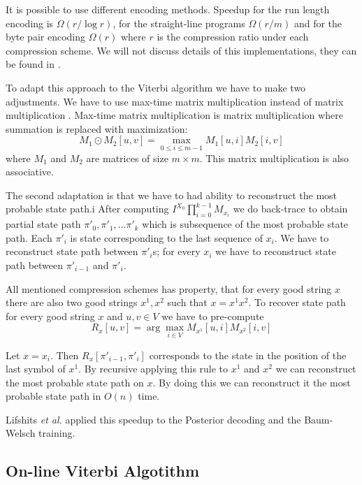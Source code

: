 It is possible to use different encoding methods. Speedup for the run length encoding 
is $\Omega(r/\log r)$, for the straight-line programs $\Omega(r/m)$ and for the
byte pair encoding $\Omega(r)$ where $r$ is the compression ratio under each
compression scheme. We will not discuss details of this implementations, they
can be found in \cite{Lifshits2009}.

To adapt this approach to the Viterbi algorithm we have to make two adjustments. 
We have to use max-time matrix multiplication instead of matrix multiplication
\cite{Lifshits2009}. Max-time matrix multiplication is matrix multiplication
where summation is replaced with maximization:
\[M_1\odot M_2 [u,v] = \max_{0\leq i\leq m-1}M_1[u,i]M_2[i,v] \]
where $M_1$ and $M_2$ are matrices of size $m\times m$. This matrix
multiplication is also associative.

The second adaptation is that we have to had ability to reconstruct 
the most probable state path.i
After computing $I^{X_0}\prod_{i=0}^{k-1}M_{x_i}$ we do back-trace to obtain 
partial state path $\pi'_0,\pi'_1,\dots \pi'_{k}$ which is subsequence of the
most probable state path. Each $\pi'_i$ is state corresponding to the last
sequence of $x_i$. We have to reconstruct state path between $\pi'_i$s; for
every $x_i$ we have to reconstruct state path between $\pi'_{i-1}$ and $\pi'_i$.

All mentioned compression schemes has property,
that for every good string $x$ there are also two good strings $x^1,x^2$ such
that $x=x^1x^2$. To recover state path for every good string $x$ and $u,v\in V$
we have to pre-compute \[R_x[u,v] = \arg\max_{i\in V}M_{x^1}[u,i]M_{x^2}[i,v]\]

Let $x=x_i$. Then $R_{x}[\pi'_{i-1},\pi'_{i}]$ corresponds to the state in the
position of the last symbol of $x^1$. By recursive applying this rule to $x^1$
and $x^2$ we can reconstruct the most probable state path on $x$. By doing this
we can reconstruct it the most probable state path in $O(n)$ time.

Lifshits {\it et al.} applied this  speedup to the Posterior decoding and the
Baum-Welsch training.


\subsection{On-line Viterbi Algotithm}

